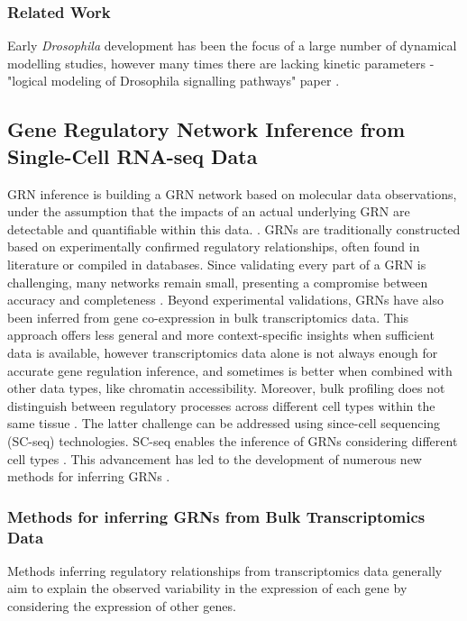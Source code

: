 \subsubsection{Related Work}
Early \textit{Drosophila} development has been the focus of a large number of dynamical modelling studies, 
however many times there are lacking kinetic parameters - "logical modeling of Drosophila signalling pathways" paper 
\cite{mbodj2013logical} .

\subsection{Gene Regulatory Network Inference from Single-Cell RNA-seq Data}
GRN inference is building a GRN network based on molecular data observations, under the assumption that the impacts of an 
actual underlying GRN are detectable and quantifiable within this data. \cite{badia2023gene}.
GRNs are traditionally constructed based on experimentally confirmed regulatory relationships, often found in literature or 
compiled in databases. Since validating every part of a GRN is challenging, many networks remain small, presenting a compromise 
between accuracy and completeness \cite{levine2005gene,Wilczynski2010}. Beyond experimental validations, GRNs have also been 
inferred from gene co-expression in bulk transcriptomics data. This approach offers less general and more context-specific 
insights when sufficient data is available, however transcriptomics data alone is not always enough for accurate gene 
regulation inference, and sometimes is better when combined with other data types, like chromatin accessibility. 
Moreover, bulk profiling does not distinguish between regulatory processes across different cell types within the same 
tissue \cite{badia2023gene}. 
The latter challenge can be addressed using since-cell sequencing (SC-seq) technologies. 
SC-seq enables the inference of GRNs considering different cell types \cite{klein2015droplet, macosko2015highly}. 
This advancement has led to the development of numerous new methods for inferring GRNs \cite{badia2023gene}. 

\subsubsection{Methods for inferring GRNs from Bulk Transcriptomics Data}
Methods inferring regulatory relationships from transcriptomics data generally aim to explain the observed variability 
in the expression of each gene by considering the expression of other genes. 

